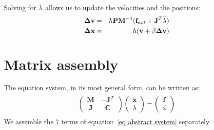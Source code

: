 Solving for $\bar{\mathbf{\lambda}}$ allows us to update the velocities and the positions:
\begin{eqnarray}
 \mathbf{\Delta v} &=& h\mathbf{P}\mathbf{M}^{-1}(\mathbf{f}_{ext} +\mathbf{J}^T \bar{\mathbf{\lambda}} ) \label{eq update velocities}\\
\mathbf{\Delta x} &=& h( \mathbf{v} + \beta \mathbf{\Delta v} ) \label{eq update positions}
\end{eqnarray}



\section{Matrix assembly} \label{sec matrix assembly}
The equation system, in its most general form, can be written as:
\begin{equation}
 \label{eq abstract system}
 \left( \begin{array}{cc}
\mathbf{M} & -\mathbf{J}^T \\
\mathbf{J} &  \mathbf{C} \end{array}\right)
\left( \begin{array}{c}
\mathbf{x} \\ \mathbf{\lambda}
\end{array}\right) = \left( \begin{array}{c}
\mathbf{f}  \\
\phi
\end{array}\right) 
\end{equation}
We assemble the $7$ terms of equation~\ref{eq abstract system} separately. 

